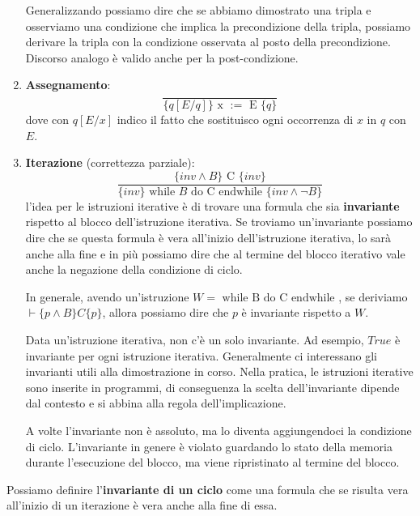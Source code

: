 \begin{enumerate}
          Generalizzando possiamo dire che se abbiamo dimostrato una tripla e
          osserviamo una condizione che implica la precondizione della tripla,
          possiamo derivare la tripla con la condizione osservata al posto della
          precondizione. Discorso analogo è valido anche per la post-condizione.
    \item \textbf{Assegnamento}:
          \begin{equation}
              \frac{}{\{q[E/q]\} \text{ x } := \text{ E }\{q\}}
          \end{equation}
          dove con $q[E / x]$ indico il fatto che sostituisco ogni occorrenza di
          $x$ in $q$ con $E$.
    \item \textbf{Iterazione} (correttezza parziale):
          \begin{equation}
              \frac{\{inv \land B\} \text{ C } \{inv\}}{\{inv\} \text{ while } B
                  \text{ do C endwhile } \{inv \land \lnot B\}}
          \end{equation}
          l'idea per le istruzioni iterative è di trovare una formula che sia
          \textbf{invariante} rispetto al blocco dell'istruzione iterativa. Se
          troviamo un'invariante possiamo dire che se questa formula è vera
          all'inizio dell'istruzione iterativa, lo sarà anche alla fine e in più
          possiamo dire che al termine del blocco iterativo vale anche la
          negazione della condizione di ciclo.

          In generale, avendo un'istruzione $W = \text{ while B do C endwhile }$,
          se deriviamo $\vdash \{p \land B\} C \{p\}$, allora possiamo dire che
          $p$ è invariante rispetto a $W$.

          Data un'istruzione iterativa, non c'è un solo invariante. Ad esempio,
          $True$ è invariante per ogni istruzione iterativa. Generalmente ci
          interessano gli invarianti utili alla dimostrazione in corso. Nella
          pratica, le istruzioni iterative sono inserite in programmi, di
          conseguenza la scelta dell'invariante dipende dal contesto e si abbina
          alla regola dell'implicazione.

          A volte l'invariante non è assoluto, ma lo diventa aggiungendoci la
          condizione di ciclo. L'invariante in genere è violato guardando lo
          stato della memoria durante l'esecuzione del blocco, ma viene
          ripristinato al termine del blocco.
\end{enumerate}
\begin{definizione}
    Possiamo definire l'\textbf{invariante di un ciclo} come una formula che se
    risulta vera all'inizio di un iterazione è vera anche alla fine di essa.
\end{definizione}
